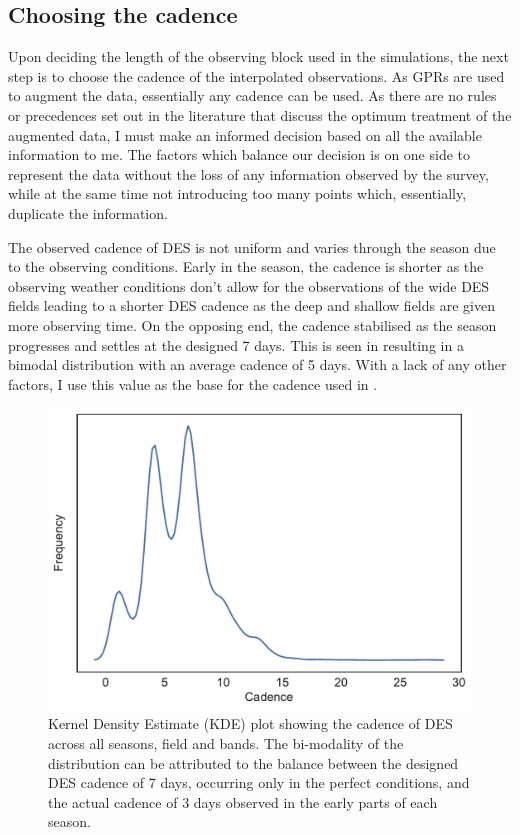 \subsection{Choosing the cadence} \label{sec:SimCadance}
Upon deciding the length of the observing block used in the simulations, the next step is to choose the cadence of the interpolated observations. As GPRs are used to augment the data, essentially any cadence can be used. As there are no rules or precedences set out in the literature that discuss the optimum treatment of the augmented data, I must make an informed decision based on all the available information to me. The factors which balance our decision is on one side to represent the data without the loss of any information observed by the survey, while at the same time not introducing too many points which, essentially, duplicate the information.

The observed cadence of DES is not uniform and varies through the season due to the observing conditions. Early in the season, the cadence is shorter as the observing weather conditions don't allow for the observations of the wide DES fields leading to a shorter DES cadence as the deep and shallow fields are given more observing time. On the opposing end, the cadence stabilised as the season progresses and settles at the designed 7 days. This is seen in  resulting in a bimodal distribution with an average cadence of 5 days. With a lack of any other factors, I use this value as the base for the cadence used in .

\begin{figure}
  \includegraphics[width=\textwidth]{Figures/Chapter5/Cadence.pdf}
  \caption{Kernel Density Estimate (KDE) plot showing the cadence of DES across all seasons, field and bands. The bi-modality of the distribution can be attributed to the balance between the designed DES cadence of 7 days, occurring only in the perfect conditions, and the actual cadence of 3 days observed in the early parts of each season.}
  \label{fig:cadence}
\end{figure}


